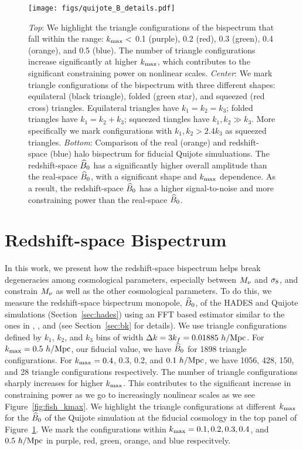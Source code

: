 \begin{figure}
\begin{center}
    \texttt{[image: figs/quijote\_B\_details.pdf]}
    \caption{
        {\em Top}: We highlight the triangle configurations of the bispectrum that fall within the range: 
        $k_{\rm max} <$ 0.1 (purple), 0.2 (red), 0.3 (green), 0.4 (orange), and 0.5 (blue). The number of 
        triangle configurations increase significantly at higher $k_{\rm max}$, which contributes to the 
        significant constraining power on nonlinear scales. 
        {\em Center}: We mark triangle configurations of the bispectrum with three different shapes:
        equilateral (black triangle), folded (green star), and squeezed (red cross) triangles. Equilateral 
        triangles have $k_1 = k_2 = k_3$; folded triangles have $k_1 = k_2 + k_3$; squeezed tiangles have 
        $k_1, k_2 \gg k_3$. More specifically we mark configurations with $k_1, k_2 > 2.4k_3$ as squeezed 
        triangles. 
        {\em Bottom}: Comparison of the real (orange) and redshift-space (blue) halo bispectrum for 
        fiducial Quijote simuluations. The redshift-space $\widehat{B}_0$ has a significantly higher 
        overall amplitude than the real-space $\widehat{B}_0$, with a significant shape and $k_{\rm max}$ 
        dependence. As a result, the redshift-space $\widehat{B}_0$ has a higher signal-to-noise and more 
        constraining power than the real-space $\widehat{B}_0$.  
    } 
\label{fig:bk_details}
\end{center}
\end{figure}
\section{Redshift-space Bispectrum} \label{sec:bk_details}
In this work, we present how the redshift-space bispectrum helps break degeneracies 
among cosmological parameters, especially between $M_\nu$ and $\sigma_8$, and constrain 
$M_\nu$ as well as the other cosmological parameters. To do this, we measure the 
redshift-space bispectrum monopole, $\widehat{B}_0$, of the HADES and Quijote simulations 
(Section~\ref{sec:hades}) using an FFT based estimator similar to the ones in 
\cite{sefusatti2005a}, \cite{scoccimarro2015}, and \cite{sefusatti2016} 
(see Section~\ref{sec:bk} for details). We use triangle configurations defined by 
$k_1$, $k_2$, and $k_3$ bins of width $\Delta k = 3k_f = 0.01885~h/{\rm Mpc}$. 
For $k_{\rm max} = 0.5~h/{\rm Mpc}$, our fiducial value, we have $\widehat{B}_0$ for 1898 
triangle configurations. For $k_{\rm max} = 0.4$, 0.3, 0.2, and $0.1~h/{\rm Mpc}$, 
we have 1056, 428, 150, and 28 triangle configurations respectively. The number
of triangle configurations sharply increases for higher $k_{\rm max}$. This
contributes to the significant increase in constraining power as we go to increasingly 
nonlinear scales as we see Figure~\ref{fig:fish_kmax}. We highlight the triangle 
configurations at different $k_{\rm max}$ for the $\widehat{B}_0$ of the Quijote simulation 
at the fiducial cosmology in the top panel of Figure~\ref{fig:bk_details}. We mark 
the configurations within $k_{\rm max} = 0.1, 0.2, 0.3, 0.4$, and $0.5~h/{\rm Mpc}$ 
in purple, red, green, orange, and blue respecitvely. 


